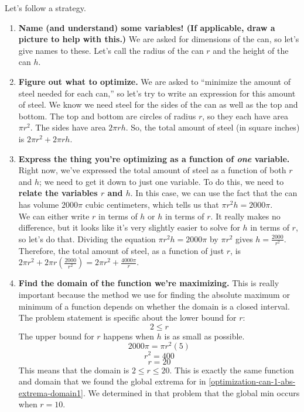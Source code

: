 \documentclass{article}
\begin{document}
\begin{enumerate}
  \begin{solution}
      Let's follow a strategy.
      \begin{enumerate}[label=\arabic*.] 
      \item \textbf{Name (and understand) some variables!  (If applicable,
          draw a picture to help with this.)} We are asked for dimensions of
        the can, so let's give names to these.  Let's call the radius of the
        can $r$ and the height of the can $h$.
      \item \textbf{Figure out what to optimize.}  We are asked to
        ``minimize the amount of steel needed for each can,'' so
        let's try to write an expression for this amount of steel.  We
        know we need steel for the sides of the can as well as the top
        and bottom.  The top and bottom are circles of radius $r$, so they
        each have area $\pi r^2$.  The sides have area $2 \pi r h$.  So, the
        total amount of steel (in square inches) is $2 \pi r^2 + 2 \pi r
        h$. 
      \item \textbf{Express the thing you're optimizing as a function of
          \textit{one} variable.}  Right now, we've expressed the total
        amount of steel as a function of both $r$ and $h$; we need to get
        it down to just one variable.  To do this, we need to \textbf{relate
          the variables $r$ and $h$}.  In this case, we can use the fact
        that the can has volume $2000 \pi$ cubic centimeters, which tells us
        that $\pi r^2 h = 2000 \pi$.\\
        We can either write $r$ in terms of $h$ or $h$ in terms of $r$.  It
        really makes no difference, but it looks like it's very slightly
        easier to solve for $h$ in terms of $r$, so let's do that.  Dividing
        the equation $\pi r^2 h = 2000 \pi$ by $\pi r^2$ gives $h =
        \frac{2000}{r^2}$.\\
        Therefore, the total amount of steel, as a function of just $r$,
        is $2 \pi r^2 + 2 \pi r \left( \frac{2000}{r^2} \right) = 2 \pi r^2 +
        \frac{4000 \pi}{r}$. 
      \item \textbf{Find the domain of the function we're maximizing.}  This
        is really important because the method we use for finding the
        absolute maximum or minimum of a function depends on whether the
        domain is a closed interval. The problem statement is specific about the lower bound for $r$: $$2 \leq r$$
        The upper bound for $r$ happens when $h$ is as small as possible. 
        $$ 2000 \pi = \pi r^2 (5)$$ 
        $$r^2 =400$$
        $$ r =20$$ 
        This means that the domain is $2 \leq r \leq 20$. This is exactly the
        same function and domain that we found the global extrema for in 
        \ref{optimization-can-1-abs-extrema-domain1}. We determined in that
        problem that the global min occurs when $r=10$.


\end{enumerate}
\end{solution}
\end{enumerate}
\end{document}
